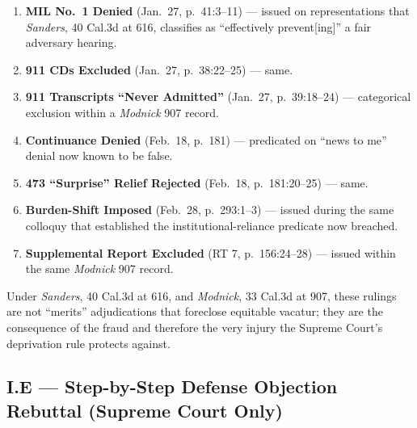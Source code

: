 \begin{enumerate}
\def\labelenumi{\arabic{enumi}.}
\tightlist
\item
  \textbf{MIL No.~1 Denied} (Jan.~27, p.~41:3--11) --- issued on representations that \emph{Sanders}, 40 Cal.3d at 616, classifies as ``effectively prevent{[}ing{]}'' a fair adversary hearing.
\item
  \textbf{911 CDs Excluded} (Jan.~27, p.~38:22--25) --- same.
\item
  \textbf{911 Transcripts ``Never Admitted''} (Jan.~27, p.~39:18--24) --- categorical exclusion within a \emph{Modnick} 907 record.
\item
  \textbf{Continuance Denied} (Feb.~18, p.~181) --- predicated on ``news to me'' denial now known to be false.
\item
  \textbf{\textsection{} 473 ``Surprise'' Relief Rejected} (Feb.~18, p.~181:20--25) --- same.
\item
  \textbf{Burden-Shift Imposed} (Feb.~28, p.~293:1--3) --- issued during the same colloquy that established the institutional-reliance predicate now breached.
\item
  \textbf{Supplemental Report Excluded} (RT 7, p.~156:24--28) --- issued within the same \emph{Modnick} 907 record.
\end{enumerate}

Under \emph{Sanders}, 40 Cal.3d at 616, and \emph{Modnick}, 33 Cal.3d at 907, these rulings are not ``merits'' adjudications that foreclose equitable vacatur; they are the consequence of the fraud and therefore the very injury the Supreme Court's deprivation rule protects against.

\subsection{I.E --- Step-by-Step Defense Objection Rebuttal (Supreme Court Only)}\label{i.e-step-by-step-defense-objection-rebuttal-supreme-court-only}

